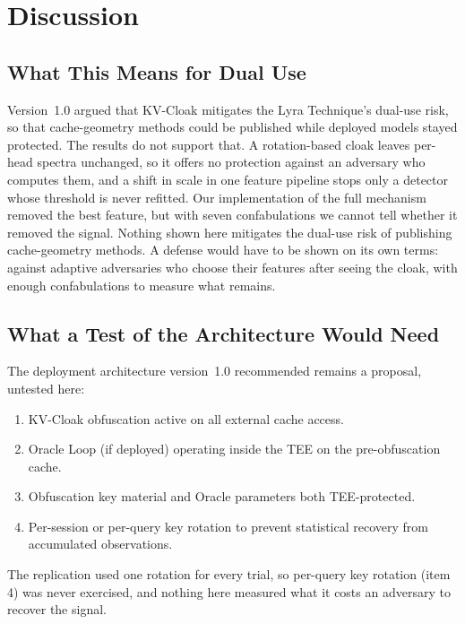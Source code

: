 \section{Discussion}

\subsection{What This Means for Dual Use}

Version~1.0 argued that KV-Cloak mitigates the Lyra Technique's dual-use
risk, so that cache-geometry methods could be published while deployed
models stayed protected. The results do not support that. A
rotation-based cloak leaves per-head spectra unchanged, so it offers no
protection against an adversary who computes them, and a shift in scale
in one feature pipeline stops only a detector whose threshold is never
refitted. Our implementation of the full mechanism removed the best
feature, but with seven confabulations we cannot tell whether it removed
the signal. Nothing shown here mitigates the dual-use risk of publishing
cache-geometry methods. A defense would have to be shown on its own terms:
against adaptive adversaries who choose their features after seeing the
cloak, with enough confabulations to measure what remains.

\subsection{What a Test of the Architecture Would Need}

The deployment architecture version~1.0 recommended remains a proposal,
untested here:

\begin{enumerate}
\item KV-Cloak obfuscation active on all external cache access.
\item Oracle Loop (if deployed) operating inside the TEE on the
pre-obfuscation cache.
\item Obfuscation key material and Oracle parameters both
TEE-protected.
\item Per-session or per-query key rotation to prevent statistical
recovery from accumulated observations.
\end{enumerate}

The replication used one rotation for every trial, so per-query key
rotation (item 4) was never exercised, and nothing here measured what it
costs an adversary to recover the signal.

